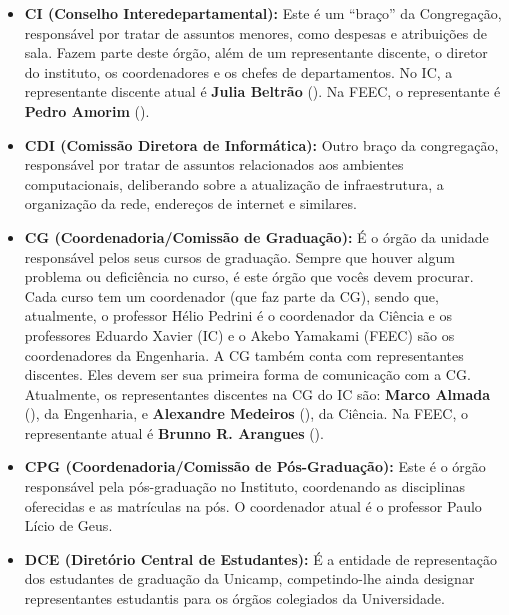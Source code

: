 \begin{itemize}
    \item  \textbf{CI (Conselho Interedepartamental):} Este é um ``braço'' da
        Congregação, responsável por tratar de assuntos menores, como despesas e
        atribuições de sala. Fazem parte deste órgão, além de um representante
        discente, o diretor do instituto, os coordenadores e os chefes de
        departamentos. No IC, a representante discente atual é \textbf{Julia
        Beltrão} (). Na FEEC, o
        representante é \textbf{Pedro Amorim}
        ().

    \item  \textbf{CDI (Comissão Diretora de Informática):} Outro braço da
        congregação, responsável por tratar de assuntos relacionados aos
        ambientes computacionais, deliberando sobre a atualização de
        infraestrutura, a organização da rede, endereços de internet e
        similares.

    \item  \textbf{CG (Coordenadoria/Comissão de Graduação):} É o órgão da
        unidade responsável pelos seus cursos de graduação. Sempre que houver
        algum problema ou deficiência no curso, é este órgão que vocês devem
        procurar.  Cada curso tem um coordenador (que faz parte da CG), sendo
        que, atualmente, o professor Hélio Pedrini é o coordenador da Ciência e
        os professores Eduardo Xavier (IC) e o Akebo Yamakami (FEEC) são os
        coordenadores da Engenharia. A CG também conta com representantes
        discentes. Eles devem ser sua primeira forma de comunicação com a CG.
        Atualmente, os representantes discentes na CG do IC são: \textbf{Marco
        Almada} (), da Engenharia, e
        \textbf{Alexandre Medeiros} (), da
        Ciência. Na FEEC, o representante atual é \textbf{Brunno R. Arangues}
        ().

    \item  \textbf{CPG (Coordenadoria/Comissão de Pós-Graduação):} Este é o
        órgão responsável pela pós-graduação no Instituto, coordenando as
        disciplinas oferecidas e as matrículas na pós. O coordenador atual é o
        professor Paulo Lício de Geus.

    \item  \textbf{DCE (Diretório Central de Estudantes):} É a entidade de
        representação dos estudantes de graduação da Unicamp, competindo-lhe
        ainda designar representantes estudantis para os órgãos colegiados da
        Universidade.


\end{itemize}
